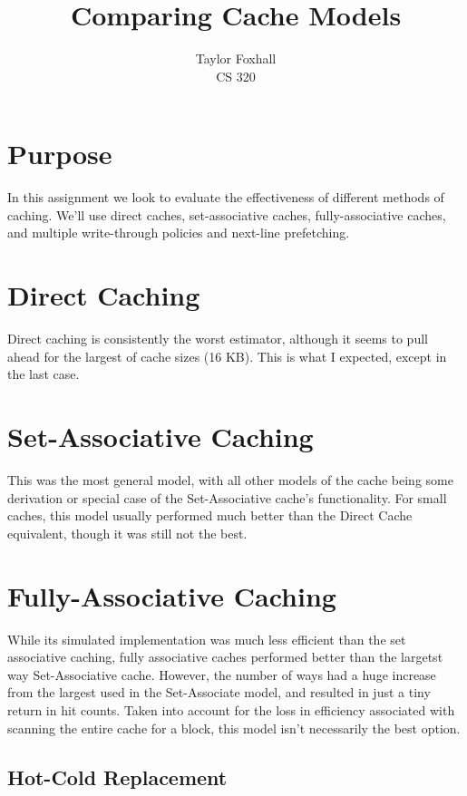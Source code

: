 \documentclass[12pt]{article}
\begin{document}
 
\title{Comparing Cache Models}
\author{Taylor Foxhall\\
CS 320}
 
\maketitle
\section{Purpose}

In this assignment we look to evaluate the effectiveness of different methods of
caching. We'll use direct caches, set-associative caches, fully-associative
caches, and multiple write-through policies and next-line prefetching.
 
\section{Direct Caching}

Direct caching is consistently the worst estimator, although it seems to pull
ahead for the largest of cache sizes (16 KB). This is what I expected, except in
the last case.

\section{Set-Associative Caching}

This was the most general model, with all other models of the cache being some
derivation or special case of the Set-Associative cache's functionality. For
small caches, this model usually performed much better than the Direct Cache
equivalent, though it was still not the best.

\section{Fully-Associative Caching}

While its simulated implementation was much less efficient than the set
associative caching, fully associative caches performed better than the largetst
way Set-Associative cache. However, the number of ways had a huge increase from
the largest used in the Set-Associate model, and resulted in just a tiny
return in hit counts. Taken into account for the loss in efficiency associated
with scanning the entire cache for a block, this model isn't necessarily the
best option.

\subsection{Hot-Cold Replacement}
\end{document}
